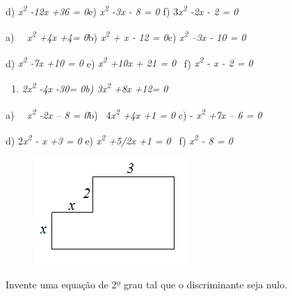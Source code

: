 \begin{exercicios}
d) \textit{x\textsuperscript{2} -12x +36 = 0\quad }e) \textit{x\textsuperscript{2} -3x -  8 = 0 \quad \quad }f) 3\textit{x\textsuperscript{2} -2x - 2 = 0}


a)~~ \textit{x\textsuperscript{2} +4x +4= 0\quad \quad }b) \textit{x\textsuperscript{2} + x - 12 = 0\quad }\quad c) \textit{x\textsuperscript{2} –3x - 10 = 0\quad }

d) \textit{x\textsuperscript{2} -7x +10 = 0 \quad }e) \textit{x\textsuperscript{2} +10x + 21 = 0~ \quad \quad }f) \textit{x\textsuperscript{2} - x - 2 = 0}


\begin{enumerate}[label=\alph*)]
	\item \textit{2x\textsuperscript{2} -4x -30= 0\quad \quad \quad b) 3x\textsuperscript{2} +8x +12= 0}
\end{enumerate}


a)~~ \textit{x\textsuperscript{2} -2x – 8 = 0\quad \quad }b)~ 4\textit{x\textsuperscript{2} +4x +1 = 0\quad } \quad c) - \textit{x\textsuperscript{2} +7x – 6 = 0}

d) 2\textit{x\textsuperscript{2} - x +3 = 0 \quad \quad }e)  \textit{x\textsuperscript{2} +5/2x +1 = 0~ \quad \quad }f) \textit{x\textsuperscript{2} - 8 = 0}


\begin{figure}[H]
    \centering
    \includegraphics{capitulos/equacoes_de_primeiro_e_segundo_grau/media/image3.png}
\end{figure}

	\item{ Invente uma equação de 2º grau tal que o discriminante seja nulo.}


\end{exercicios}
